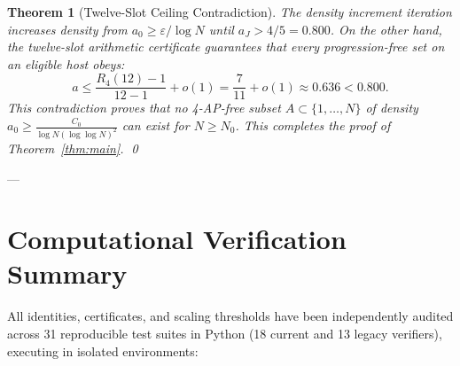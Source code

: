\documentclass[11pt,reqno]{amsart}
\theoremstyle{plain}
\newtheorem{theorem}{Theorem}[section]
\theoremstyle{definition}
\newcommand{\eps}{\varepsilon}
\begin{document}
\begin{theorem}[Twelve-Slot Ceiling Contradiction]\label{thm:terminal_contradiction}
The density increment iteration increases density from $a_0 \ge \eps / \log N$ until $a_J > 4/5 = 0.800$.
On the other hand, the twelve-slot arithmetic certificate guarantees that every progression-free set on an eligible host obeys:
\begin{equation}
a \le \frac{R_4(12) - 1}{12 - 1} + o(1) = \frac{7}{11} + o(1) \approx 0.636 < 0.800.
\end{equation}
This contradiction proves that no 4-AP-free subset $A \subset \{1, \dots, N\}$ of density $a_0 \ge \frac{C_0}{\log N (\log\log N)^2}$ can exist for $N \ge N_0$.
This completes the proof of Theorem~\ref{thm:main}. \qed
\end{theorem}

---

\section{Computational Verification Summary}

All identities, certificates, and scaling thresholds have been independently audited across 31 reproducible test suites in Python (18 current and 13 legacy verifiers), executing in isolated environments:
\end{document}
